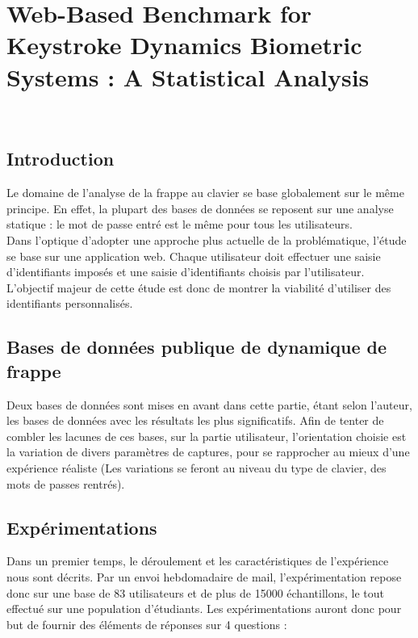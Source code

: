 \section{Web-Based Benchmark for Keystroke Dynamics Biometric Systems : A Statistical Analysis\cite{giotWeb}}

\\

\subsection{Introduction}

Le domaine de l'analyse de la frappe au clavier se base globalement sur le même principe. En effet, la plupart des bases de données se reposent sur une analyse statique : le mot de passe entré est le même pour tous les utilisateurs.\\

Dans l'optique d'adopter une approche plus actuelle de la problématique, l'étude se base sur une application web. Chaque utilisateur doit effectuer une saisie d'identifiants imposés et une saisie d'identifiants choisis par l'utilisateur. L'objectif majeur de cette étude est donc de montrer la viabilité d'utiliser des identifiants personnalisés.

\subsection{Bases de données publique de dynamique de frappe}
 
Deux bases de données sont mises en avant dans cette partie, étant selon l'auteur, les bases de données avec les résultats les plus significatifs. Afin de tenter de combler les lacunes de ces bases, sur la partie utilisateur, l'orientation choisie est la variation de divers paramètres de captures, pour se rapprocher au mieux d'une expérience réaliste (Les variations se feront au niveau du type de clavier, des mots de passes rentrés).

\subsection{Expérimentations}

Dans un premier temps, le déroulement et les caractéristiques de l'expérience nous sont décrits. Par un envoi hebdomadaire de mail, l'expérimentation repose donc sur une base de 83 utilisateurs  et de plus de 15000 échantillons, le tout effectué sur une population d'étudiants. Les expérimentations auront donc pour but de fournir des éléments de réponses sur 4 questions :\\

